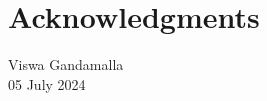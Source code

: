 \chapter*{Acknowledgments}



\vspace{2cm}

\begin{flushright}
Viswa Gandamalla \\
05 July 2024
\end{flushright}